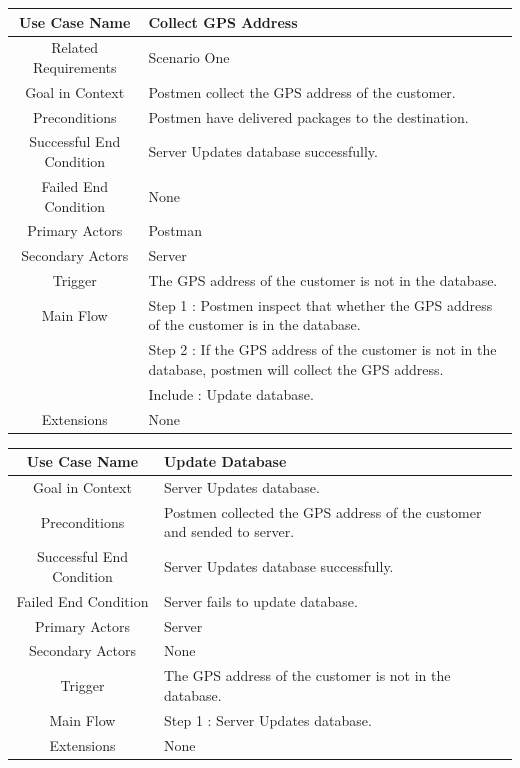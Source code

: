 \documentclass[12pt]{scrreprt}
\begin{document}
\begin{table}
  \centering
  \begin{tabular}{| c | p{11cm} |}
    \hline
    Use Case Name & Collect GPS Address\\
    \hline
    Related Requirements & Scenario One\\
    \hline
    Goal in Context & Postmen collect the GPS address of the customer.\\
    \hline
    Preconditions & Postmen have delivered packages to the destination.\\
    \hline
    Successful End Condition & Server Updates database successfully.\\
    \hline
    Failed End Condition & None\\
    \hline
    Primary Actors & Postman\\
    \hline
    Secondary Actors & Server\\
    \hline
    Trigger & The GPS address of  the customer is not in the database.\\
    \hline
    Main Flow & Step 1 : Postmen inspect that whether the GPS address of
    the customer is in the database.\\
    & Step 2 : If the GPS address of  the customer is not in the database,
    postmen will collect the GPS address.\\
    & Include : Update database.\\
    \hline
    Extensions & None\\
    \hline
  \end{tabular}
\end{table}

\begin{table}
  \centering
  \begin{tabular}{| c | p{11cm} |}
    \hline
    Use Case Name & Update Database\\
    \hline
    Goal in Context & Server Updates database.\\
    \hline
    Preconditions & Postmen collected the GPS address of  the customer and
    sended to server.\\
    \hline
    Successful End Condition & Server Updates database successfully.\\
    \hline
    Failed End Condition & Server fails to update database.\\
    \hline
    Primary Actors & Server\\
    \hline
    Secondary Actors & None\\
    \hline
    Trigger & The GPS address of  the customer is not in the database.\\
    \hline
    Main Flow & Step 1 : Server Updates database.\\
    \hline
    Extensions & None\\
    \hline
  \end{tabular}
\end{table}
\end{document}
